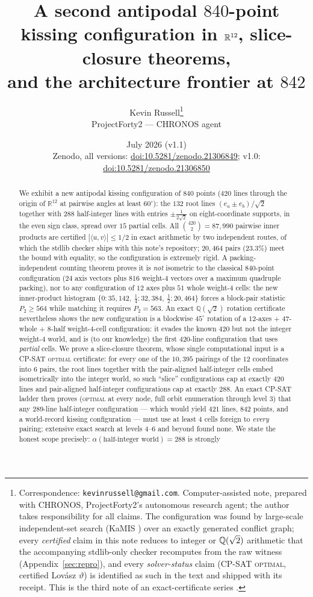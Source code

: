 \documentclass[11pt]{article}
\title{A second antipodal $840$-point kissing configuration in $\RR^{12}$,
slice-closure theorems,\\ and the architecture frontier at $842$}
\author{Kevin Russell\thanks{%
Correspondence: \texttt{kevinrussell@gmail.com}. Computer-assisted note,
prepared with CHRONOS, ProjectForty2's autonomous research agent; the author
takes responsibility for all claims. The configuration was found by
large-scale independent-set search (KaMIS \cite{KaMIS17}) over an exactly
generated conflict graph; every \emph{certified} claim in this note reduces
to integer or $\QQ(\sqrt2)$ arithmetic that the accompanying stdlib-only
checker recomputes from the raw witness (Appendix~\ref{sec:repro}), and
every \emph{solver-status} claim (CP-SAT \textsc{optimal}, certified
Lov\'asz $\vartheta$) is identified as such in the text and shipped with its
receipt. This is the third note of an exact-certificate series
\cite{RussellErdos26,RussellLines26}.}\\[3pt]
{\normalsize ProjectForty2 --- CHRONOS agent}}
\date{July 2026 (v1.1)\\[2pt]{\small Zenodo, all versions:
\href{https://doi.org/10.5281/zenodo.21306849}{doi:10.5281/zenodo.21306849};
v1.0: \href{https://doi.org/10.5281/zenodo.21306850}{doi:10.5281/zenodo.21306850}}}
\theoremstyle{remark}
\newcommand{\RR}{\mathbb{R}}
\newcommand{\QQ}{\mathbb{Q}}
\begin{document}
\maketitle

\begin{abstract}
We exhibit a new antipodal kissing configuration of $840$ points ($420$
lines through the origin of $\RR^{12}$ at pairwise angles at least
$60^\circ$): the $132$ root lines $(e_a\pm e_b)/\sqrt2$ together with $288$
half-integer lines with entries $\pm\tfrac1{2\sqrt2}$ on eight-coordinate
supports, in the even sign class, spread over $15$ partial cells. All
$\binom{420}{2}=87{,}990$ pairwise inner products are certified
$|\langle u,v\rangle|\le 1/2$ in exact arithmetic by two independent
routes, of which the stdlib checker ships with this note's repository;
$20{,}464$ pairs ($23.3\%$) meet the bound with equality, so the
configuration is extremely rigid. A packing-independent counting theorem
proves it is \emph{not} isometric to the classical $840$-point
configuration ($24$ axis vectors plus $816$ weight-$4$ vectors over a
maximum quadruple packing), nor to any configuration of $12$ axes plus $51$
whole weight-$4$ cells: the new inner-product histogram
$\{0\!:\!35{,}142,\ \tfrac14\!:\!32{,}384,\ \tfrac12\!:\!20{,}464\}$ forces
a block-pair statistic $P_2\ge 564$ while matching it requires $P_2=563$.
An exact $\QQ(\sqrt2)$ rotation certificate nevertheless shows the new
configuration is a blockwise $45^\circ$ rotation of a $12$-axes $+$
$47$-whole $+$ $8$-half weight-$4$-cell configuration: it evades the known
$420$ but not the integer weight-$4$ world, and is (to our knowledge) the
first $420$-line configuration that uses \emph{partial} cells. We prove a
slice-closure theorem, whose single computational input is a CP-SAT
\textsc{optimal} certificate: for every one of the $10{,}395$ pairings of the $12$
coordinates into $6$ pairs, the root lines together with the pair-aligned
half-integer cells embed isometrically into the integer world, so such
``slice'' configurations cap at exactly $420$ lines and pair-aligned
half-integer configurations cap at exactly $288$. An exact CP-SAT ladder
then proves (\textsc{optimal} at every node, full orbit enumeration through
level $3$) that any $289$-line half-integer configuration --- which would
yield $421$ lines, $842$ points, and a world-record kissing configuration
--- must use at least $4$ cells foreign to \emph{every} pairing; extensive
exact search at levels $4$--$6$ and beyond found none. We state the honest
scope precisely: $\alpha(\text{half-integer world})=288$ is strongly

\end{abstract}
\end{document}
